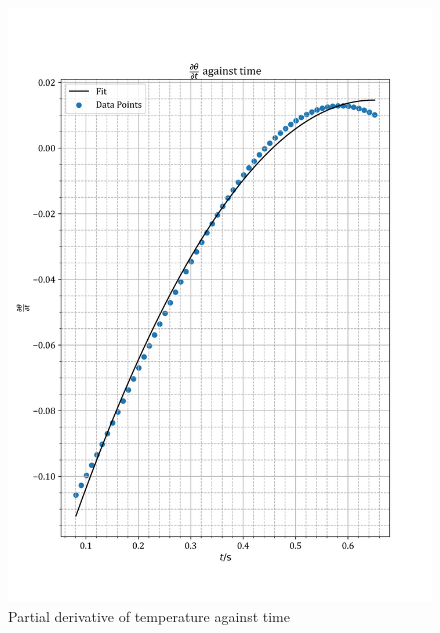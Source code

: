 \documentclass[12pt, a4paper]{article}
\begin{document}
\begin{figure}
    \centering
    \includegraphics[width=\textwidth]{PartialPlot.png}
    \caption{Partial derivative of temperature against time}
    \label{fig:Partial plot}
\end{figure}
\end{document}
